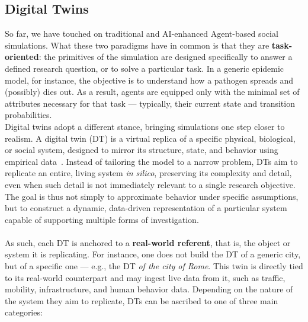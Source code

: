 \documentclass[11pt]{article}
\begin{document}
\subsection{Digital Twins}
\label{subsec:3}
So far, we have touched on traditional and AI-enhanced Agent-based social simulations.
What these two paradigms have in common is that they are \textbf{task-oriented}: the primitives of the simulation are designed specifically to answer a defined research question, or to solve a particular task.
In a generic epidemic model, for instance, the objective is to understand how a pathogen spreads and (possibly) dies out.
As a result, agents are equipped only with the minimal set of attributes necessary for that task --- typically, their current state and transition probabilities.
\\
Digital twins adopt a different stance, bringing simulations one step closer to realism.
A digital twin (DT) is a virtual replica of a specific physical, biological, or social system, designed to mirror its structure, state, and behavior using empirical data~\cite{barricelli2019survey}. 
Instead of tailoring the model to a narrow problem, DTs aim to replicate an entire, living system \textit{in silico}, preserving its complexity and detail, even when such detail is not immediately relevant to a single research objective.
The goal is thus not simply to approximate behavior under specific assumptions, but to construct a dynamic, data-driven representation of a particular system capable of supporting multiple forms of investigation.
\\ \ \\
As such, each DT is anchored to a \textbf{real-world referent}, that is, the object or system it is replicating. 
For instance, one does not build the DT of a generic city, but of a specific one — e.g., the DT \textit{of the city of Rome}. 
This twin is directly tied to its real-world counterpart and may ingest live data from it, such as traffic, mobility, infrastructure, and human behavior data.
Depending on the nature of the system they aim to replicate, DTs can be ascribed to one of three main categories:
\end{document}
